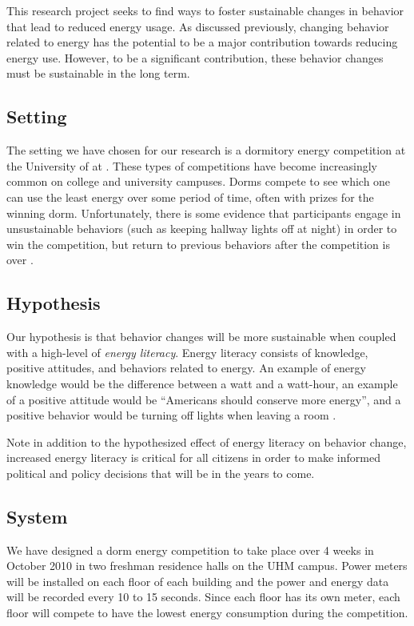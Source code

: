 This research project seeks to find ways to foster sustainable changes in behavior that lead to reduced energy usage. As discussed previously, changing behavior related to energy has the potential to be a major contribution towards reducing energy use. However, to be a significant contribution, these behavior changes must be sustainable in the long term.

\subsection{Setting}
The setting we have chosen for our research is a dormitory energy competition at the University of \Hawaii at \Manoa. These types of competitions have become increasingly common on college and university campuses. Dorms compete to see which one can use the least energy over some period of time, often with prizes for the winning dorm. Unfortunately, there is some evidence that participants engage in unsustainable behaviors (such as keeping hallway lights off at night) in order to win the competition, but return to previous behaviors after the competition is over \cite{petersen-dorm-energy-reduction}.

\subsection{Hypothesis}
Our hypothesis is that behavior changes will be more sustainable when coupled with a high-level of \emph{energy literacy}. Energy literacy consists of knowledge, positive attitudes, and behaviors related to energy. An example of energy knowledge would be the difference between a watt and a watt-hour, an example of a positive attitude would be ``Americans should conserve more energy'', and a positive behavior would be turning off lights when leaving a room \cite{DeWaters09c}.

Note in addition to the hypothesized effect of energy literacy on behavior change, increased energy literacy is critical for all citizens in order to make informed political and policy decisions that will be in the years to come.

\subsection{System}

We have designed a dorm energy competition to take place over 4 weeks in October 2010 in two freshman residence halls on the UHM campus. Power meters will be installed on each floor of each building and the power and energy data will be recorded every 10 to 15 seconds. Since each floor has its own meter, each floor will compete to have the lowest energy consumption during the competition.

